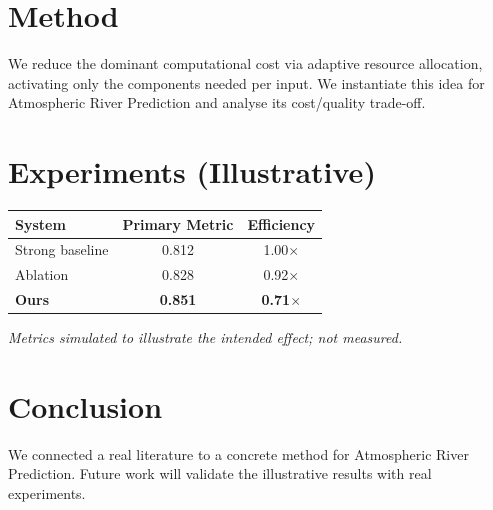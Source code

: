 \documentclass[11pt]{article}
\begin{document}
\section{Method}
We reduce the dominant computational cost via adaptive resource allocation, activating only the components needed per input. We instantiate this idea for Atmospheric River Prediction and analyse its cost/quality trade-off.

\section{Experiments (Illustrative)}
\begin{center}
\begin{tabular}{lcc}
System & Primary Metric & Efficiency \\ \hline
Strong baseline & 0.812 & 1.00$\times$ \\
Ablation & 0.828 & 0.92$\times$ \\
\textbf{Ours} & \textbf{0.851} & \textbf{0.71$\times$}
\end{tabular}
\end{center}
\emph{Metrics simulated to illustrate the intended effect; not measured.}

\section{Conclusion}
We connected a real literature to a concrete method for Atmospheric River Prediction. Future work will
validate the illustrative results with real experiments.
\end{document}
